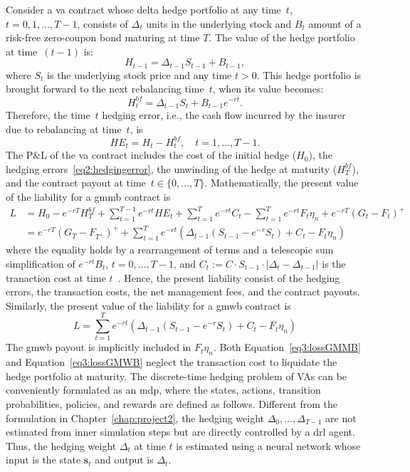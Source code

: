 Consider a \gls{va} contract whose delta hedge portfolio at any time~$t$, $t=0,1,\ldots,T-1$, consists of $\Delta_t$ units in the underlying stock and $B_t$ amount of a risk-free zero-coupon bond maturing at time $T$.
The value of the hedge portfolio at time~$(t-1)$ is:
\begin{equation*}
    H_{t-1} = \Delta_{t-1} S_{t-1} + B_{t-1},
\end{equation*}
where $S_t$ is the underlying stock price and any time $t>0$.
This hedge portfolio is brought forward to the next rebalancing time~$t$, when its value becomes:
\begin{equation*}
    H_{t}^{bf} = \Delta_{t-1} S_{t} + B_{t-1}e^{-rt}.
\end{equation*}
Therefore, the time~$t$ hedging error, i.e., the cash flow incurred by the insurer due to rebalancing at time~$t$, is
\begin{equation}
    HE_t = H_t - H^{bf}_t, \quad t=1,\ldots, T-1.
\end{equation}
The P\&L of the \gls{va} contract includes the cost of the initial hedge ($H_0$), the hedging errors~\eqref{eq2:hedgingerror}, the unwinding of the hedge at maturity ($H^{bf}_T$), and the contract payout at time~$t\in \{0,\ldots,T\}$.
Mathematically, the present value of the liability for a \gls{gmmb} contract is 
\begin{align} \label{eq3:lossGMMB}
L   & = H_0 - e^{-rT} H^{bf}_T + \sum_{t=1}^{T-1} e^{-rt} HE_t + \sum_{t=1}^T e^{-rt} C_t - \sum_{t=1}^T e^{-rt} F_t\eta_n + e^{-rT} (G_t - F_t)^+  \nonumber \\ 
    & = e^{-rT} (G_T - F_{T^+})^+ + \sum_{t=1}^T e^{-rt}  \left( \Delta_{t-1} (S_{t-1} - e^{-r} S_t) + C_t - F_t\eta_n \right) 
\end{align}
where the equality holds by a rearrangement of terms and a telescopic sum simplification of $e^{-rt}B_t$, $t=0,\ldots,T-1$, and $C_t := C \cdot S_{t-1} \cdot |\Delta_t - \Delta_{t-1}|$ is the tranaction cost at time $t$~\citep{garleanu2013dynamic}.
Hence, the present liability consist of the hedging errors, the transaction costs, the net management fees, and the contract payouts.
Similarly, the present value of the liability for a \gls{gmwb} contract is
\begin{equation} \label{eq3:lossGMWB}
L = \sum_{t=1}^T e^{-rt}  \left( \Delta_{t-1} (S_{t-1} - e^{-r} S_t) + C_t - F_t\eta_n \right)
\end{equation}
The \gls{gmwb} payout is implicitly included in $F_t\eta_n$.
Both Equation~\eqref{eq3:lossGMMB} and Equation~\eqref{eq3:lossGMWB} neglect the transaction cost to liquidate the hedge portfolio at maturity.
The discrete-time hedging problem of VAs can be conveniently formulated as an \gls{mdp}, where the states, actions, transition probabilities, policies, and rewards are defined as follows.
Different from the formulation in Chapter~\ref{chap:project2}, the hedging weight $\Delta_0, \ldots, \Delta_{T-1}$ are not estimated from inner simulation steps but are directly controlled by a \gls{drl} agent.
Thus, the hedging weight $\Delta_t$ at time $t$ is estimated using a neural network whose input is the state $\mathbf{s}_t$ and output is $\Delta_t$.

